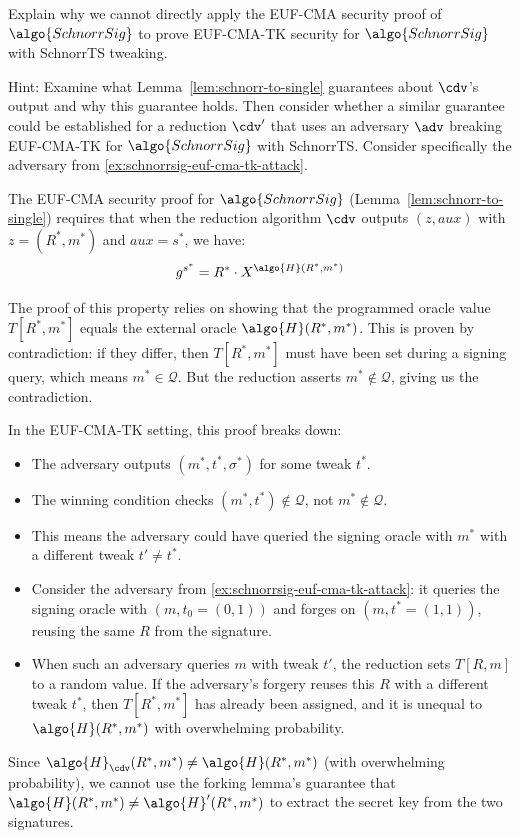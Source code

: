 \begin{exercise}
  Explain why we cannot directly apply the EUF-CMA security proof of $\algo{SchnorrSig}$ to prove EUF-CMA-TK security for $\algo{SchnorrSig}$ with SchnorrTS tweaking.
  
  Hint: Examine what Lemma~\ref{lem:schnorr-to-single} guarantees about $\cdv$'s output and why this guarantee holds. Then consider whether a similar guarantee could be established for a reduction $\cdv'$ that uses an adversary $\adv$ breaking EUF-CMA-TK for $\algo{SchnorrSig}$ with SchnorrTS. Consider specifically the adversary from \autoref{ex:schnorrsig-euf-cma-tk-attack}.
\end{exercise}

\ifsolutions
\begin{mysolution}
  The EUF-CMA security proof for $\algo{SchnorrSig}$ (Lemma~\ref{lem:schnorr-to-single}) requires that when the reduction algorithm $\cdv$ outputs $(z, \mathit{aux})$ with $z = (R^*, m^*)$ and $\mathit{aux} = s^*$, we have:
  \[
    g^{s^*} = R^* \cdot X^{\algo{H}(R^*, m^*)}
  \]
  
  The proof of this property relies on showing that the programmed oracle value $T[R^*, m^*]$ equals the external oracle $\algo{H}(R^*, m^*)$.
  This is proven by contradiction: if they differ, then $T[R^*, m^*]$ must have been set during a signing query, which means $m^* \in \mathcal{Q}$.
  But the reduction asserts $m^* \notin \mathcal{Q}$, giving us the contradiction.
  
  In the EUF-CMA-TK setting, this proof breaks down:
  \begin{itemize}
    \item The adversary outputs $(m^*, t^*, \sigma^*)$ for some tweak $t^*$.
    \item The winning condition checks $(m^*, t^*) \notin \mathcal{Q}$, not $m^* \notin \mathcal{Q}$.
    \item This means the adversary could have queried the signing oracle with $m^*$ with a different tweak $t' \neq t^*$.
    \item Consider the adversary from \autoref{ex:schnorrsig-euf-cma-tk-attack}: it queries the signing oracle with $(m, t_0 = (0,1))$ and forges on $(m, t^* = (1,1))$, reusing the same $R$ from the signature.
    \item When such an adversary queries $m$ with tweak $t'$, the reduction sets $T[R, m]$ to a random value. If the adversary's forgery reuses this $R$ with a different tweak $t^*$, then $T[R^*, m^*]$ has already been assigned, and it is unequal to $\algo{H}(R^*, m^*)$ with overwhelming probability.
  \end{itemize}
  
  Since $\algo{H}_{\cdv}(R^*, m^*) \neq \algo{H}(R^*, m^*)$ (with overwhelming probability), we cannot use the forking lemma's guarantee that $\algo{H}(R^*, m^*) \neq \algo{H}'(R^*, m^*)$ to extract the secret key from the two signatures.
\end{mysolution}
\fi

